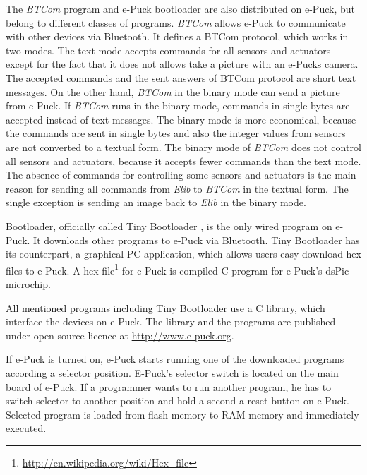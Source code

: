 \documentclass[12pt,notitlepage]{report}
\begin{document}
	The {\it BTCom} program and e-Puck bootloader are also distributed on e-Puck, but belong to different classes of programs. 
	{\it BTCom} allows e-Puck to communicate with other devices via Bluetooth.
	It defines a BTCom protocol, which works in two modes. The text mode accepts commands for
	all sensors and actuators except for the fact that it does not allows take a picture 
	with an e-Pucks camera. 
	The accepted commands and the sent answers of BTCom protocol are short text messages.
	On the other hand, {\it BTCom} in the binary mode can send a picture from e-Puck.
	If {\it BTCom} runs in the binary mode, commands in single bytes are accepted instead of text messages.
	The binary mode is more economical, 
	because the commands are sent in single bytes and also the integer values from sensors
	are not converted to a textual form.
	The binary mode of {\it BTCom} does not control all sensors and actuators, because it accepts fewer commands than the text mode.
	The absence of commands for controlling some sensors and actuators is the main reason 
	for sending all commands from {\it Elib} to {\it BTCom} in the textual form. 
	The single exception is sending an image back to {\it Elib} in the binary mode.
	 
	Bootloader, officially called Tiny Bootloader\cite{tiny}
	, is the only wired program on e-Puck. It downloads	other programs to e-Puck via Bluetooth. 
	Tiny Bootloader has its counterpart, a graphical PC application,
	which allows users easy download hex files to e-Puck.
	A hex file\footnote{\small{\url{http://en.wikipedia.org/wiki/Hex_file}}} 
	for e-Puck is compiled C program for e-Puck's dsPic microchip. 
	 
	All mentioned programs including Tiny Bootloader use a C library, which interface the devices on e-Puck. 
	The library and the programs are published under open source licence at
	\url{http://www.e-puck.org}.

	 
	If e-Puck is turned on, e-Puck starts running one of the downloaded programs according a selector 
	position. E-Puck's selector switch is located on the main board of e-Puck.
	If a programmer wants to run another program, he has to switch selector to another position
	and hold a second a reset button on e-Puck.	Selected program is loaded from flash memory
	to RAM memory and immediately executed.	
	 
\end{document}
